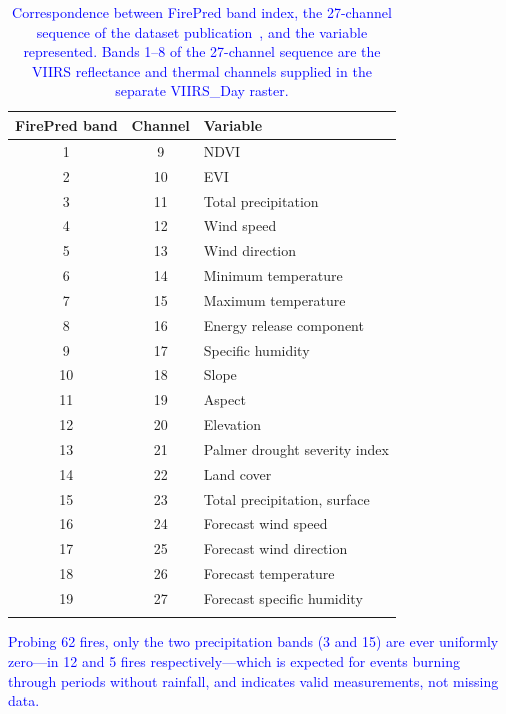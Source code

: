 \documentclass[sensors,article,submit,moreauthors,pdftex]{Definitions/mdpi}
\newcommand{\rev}[1]{\textcolor{blue}{#1}}
\begin{document}
\begin{table}[H]
\centering
\caption{\rev{Correspondence between FirePred band index, the 27-channel
sequence of the dataset publication~\cite{zhao2025tssatfire}, and the variable
represented. Bands 1--8 of the 27-channel sequence are the VIIRS reflectance and
thermal channels supplied in the separate VIIRS\_Day raster.}}
\label{tab:firepred}
\renewcommand{\arraystretch}{1.15}
\begin{tabular}{@{}ccl@{}}
\arrayrulecolor{hdrblue}
\toprule
\rowcolor{hdrblue}
\color{white}\textbf{FirePred band} &
\color{white}\textbf{Channel} &
\color{white}\textbf{Variable} \\
\midrule
\rowcolor{rowA} 1  & 9  & NDVI \\
\rowcolor{white} 2  & 10 & EVI \\
\rowcolor{rowA} 3  & 11 & Total precipitation \\
\rowcolor{white} 4  & 12 & Wind speed \\
\rowcolor{rowA} 5  & 13 & Wind direction \\
\rowcolor{white} 6  & 14 & Minimum temperature \\
\rowcolor{rowA} 7  & 15 & Maximum temperature \\
\rowcolor{white} 8  & 16 & Energy release component \\
\rowcolor{rowA} 9  & 17 & Specific humidity \\
\rowcolor{white} 10 & 18 & Slope \\
\rowcolor{rowA} 11 & 19 & Aspect \\
\rowcolor{white} 12 & 20 & Elevation \\
\rowcolor{rowA} 13 & 21 & Palmer drought severity index \\
\rowcolor{white} 14 & 22 & Land cover \\
\rowcolor{rowA} 15 & 23 & Total precipitation, surface \\
\rowcolor{white} 16 & 24 & Forecast wind speed \\
\rowcolor{rowA} 17 & 25 & Forecast wind direction \\
\rowcolor{white} 18 & 26 & Forecast temperature \\
\rowcolor{rowA} 19 & 27 & Forecast specific humidity \\
\arrayrulecolor{hdrblue}\bottomrule
\end{tabular}
\end{table}

\rev{Probing 62 fires, only the two precipitation bands (3 and 15) are ever uniformly zero---in 12 and 5 fires respectively---which is expected for events burning through periods without rainfall, and indicates valid measurements, not missing data.}
\end{document}
